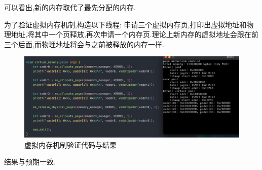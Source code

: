 可以看出,新的内存取代了最先分配的内存.

为了验证虚拟内存机制,构造以下线程:
申请三个虚拟内存页,打印出虚拟地址和物理地址,将其中一个页释放,再次申请一个内存页.理论上新内存的虚拟地址会跟在前三个后面,而物理地址将会与之前被释放的内存一样.

\begin{figure}[H]
    \centering
    \includegraphics[width=\textwidth]{figures/vt_res.png}
    \caption{虚拟内存机制验证代码与结果}
    \label{fig:my_label}
\end{figure}

结果与预期一致.